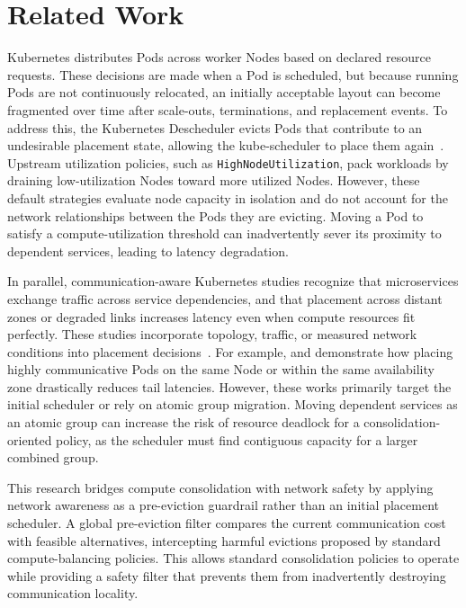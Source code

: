 \section{Related Work}
\label{bab:2}

Kubernetes distributes Pods across worker Nodes based on declared resource requests. These decisions are made when a Pod is scheduled, but because running Pods are not continuously relocated, an initially acceptable layout can become fragmented over time after scale-outs, terminations, and replacement events. To address this, the Kubernetes Descheduler evicts Pods that contribute to an undesirable placement state, allowing the kube-scheduler to place them again~\cite{k8s_descheduler_docs}. Upstream utilization policies, such as \texttt{HighNodeUtilization}, pack workloads by draining low-utilization Nodes toward more utilized Nodes. However, these default strategies evaluate node capacity in isolation and do not account for the network relationships between the Pods they are evicting. Moving a Pod to satisfy a compute-utilization threshold can inadvertently sever its proximity to dependent services, leading to latency degradation.

In parallel, communication-aware Kubernetes studies recognize that microservices exchange traffic across service dependencies, and that placement across distant zones or degraded links increases latency even when compute resources fit perfectly. These studies incorporate topology, traffic, or measured network conditions into placement decisions~\cite{marchese2022network,marchese_tomarchio_2022,chen2024trade,pusztai_pogonip_2021}. For example, \cite{marchese2022network} and \cite{chen2024trade} demonstrate how placing highly communicative Pods on the same Node or within the same availability zone drastically reduces tail latencies. However, these works primarily target the initial scheduler or rely on atomic group migration. Moving dependent services as an atomic group can increase the risk of resource deadlock for a consolidation-oriented policy, as the scheduler must find contiguous capacity for a larger combined group.

This research bridges compute consolidation with network safety by applying network awareness as a pre-eviction guardrail rather than an initial placement scheduler. A global pre-eviction filter compares the current communication cost with feasible alternatives, intercepting harmful evictions proposed by standard compute-balancing policies. This allows standard consolidation policies to operate while providing a safety filter that prevents them from inadvertently destroying communication locality.
